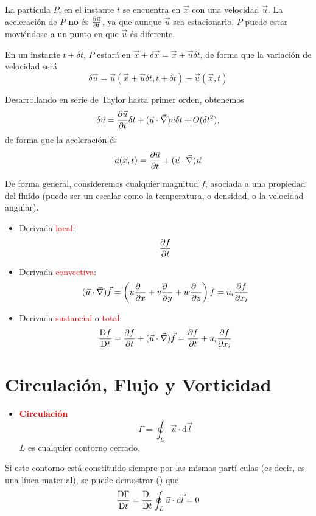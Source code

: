	
	La partícula $P$, en el instante $t$ se encuentra en $\vec{x}$
	con una velocidad $\vec{u}$. La aceleración de $P$ \textbf{no} és
	$\frac{\partial \vec{u}}{\partial t}$, ya que aunque $\vec{u}$ sea estacionario,
	$P$ puede estar moviéndose a un punto en que $\vec{u}$ és diferente.
	
	En un instante $t+\delta t$, $P$ estará en $\vec{x}+\delta\vec{x}=\vec{x}+\vec{u}\delta t$,
	de forma que la variación de velocidad será 
	\[
	\delta\vec{u}=\vec{u}(\vec{x}+\vec{u}\delta t,t+\delta t)-\vec{u}(\vec{x},t)
	\]
	
	Desarrollando en serie de Taylor hasta primer orden, obtenemos 
	\[
	\delta\vec{u}=\frac{\partial \vec{u}}{\partial t}\delta t+(\vec{u}\cdot\vec{\nabla})\vec{u}\delta t+O(\delta t^{2}),
	\]
	de forma que la aceleración és 
	\[
	\vec{a}(\vec{x},t)=\frac{\partial \vec{u}}{\partial t}+(\vec{u}\cdot\vec{\nabla})\vec{u}
	\]
	

De forma general, consideremos cualquier magnitud $f$, asociada a
una propiedad del fluido (puede ser un escalar como la temperatura,
o densidad, o la velocidad angular). 
\begin{itemize}
	\item Derivada \textcolor{red}{local}: 
	\[
	\frac{\partial f}{\partial t}
	\]
	
	\item Derivada \textcolor{red}{convectiva}: 
	\[
	(\vec{u}\cdot\vec{\nabla})\vec{f}=\left(u\frac{\partial \phantom{f}}{\partial x}+v\frac{\partial \phantom{f}}{\partial y}+w\frac{\partial \phantom{f}}{\partial z}\right)f=u_{i}\frac{\partial f}{\partial x_{i}}
	\]
	
	\item Derivada \textcolor{red}{sustancial} o \textcolor{red}{total}: 
	\[
	\frac{\text{D}f}{\text{D}t}=\frac{\partial f}{\partial t}+(\vec{u}\cdot\vec{\nabla})\vec{f}=\frac{\partial f}{\partial t}+u_{i}\frac{\partial f}{\partial x_{i}}
	\]
	
\end{itemize}

\section{Circulación, Flujo y Vorticidad}

	
	\begin{itemize}
		\item \textbf{\textcolor{red}{Circulación}}\\
		
		\[
		\Gamma=\oint_{L}\vec{u}\cdot\text{d}\vec{l}
		\]
		$L$ es cualquier contorno cerrado.
	\end{itemize}
	Si este contorno está constituido siempre por las mismas partí culas
	(es decir, es una línea material), se puede demostrar (\cite{Virto1})
	que 
	\[
	\frac{\text{D} \Gamma}{\text{D} t}=\frac{\text{D} \phantom{t}}{\text{D} t}\oint_{L}\vec{u}\cdot\text{d}\vec{l}=0
	\]
	


